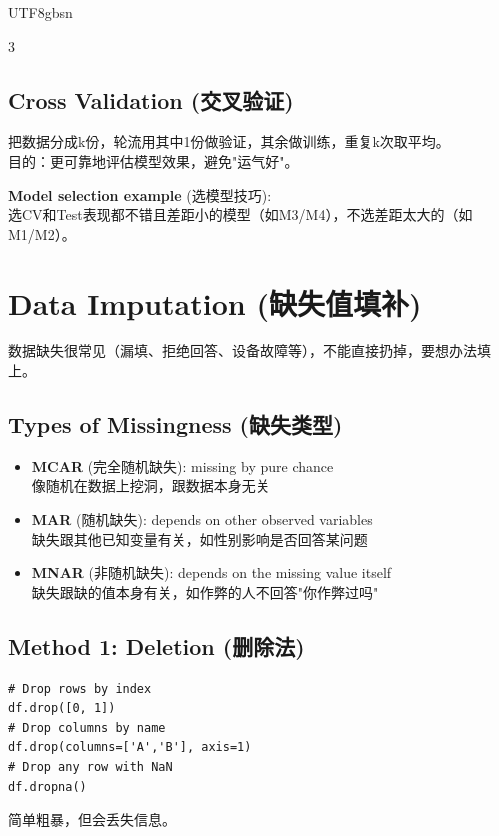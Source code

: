 \documentclass[10pt,landscape,a4paper]{article}
\newcommand{\zhint}[1]{{\scriptsize\color{gray!70!black}#1}}
\begin{document}
\begin{CJK}{UTF8}{gbsn}
\begin{multicols}{3}
\subsection{Cross Validation \zhint{(交叉验证)}}
\zhint{把数据分成k份，轮流用其中1份做验证，其余做训练，重复k次取平均。}\\
\zhint{目的：更可靠地评估模型效果，避免"运气好"。}

\textbf{Model selection example} \zhint{(选模型技巧)}:\\
\zhint{选CV和Test表现都不错且差距小的模型（如M3/M4），不选差距太大的（如M1/M2）。}

\section{Data Imputation \zhint{(缺失值填补)}}

\zhint{数据缺失很常见（漏填、拒绝回答、设备故障等），不能直接扔掉，要想办法填上。}

\subsection{Types of Missingness \zhint{(缺失类型)}}
\begin{itemize}[leftmargin=*, nosep, itemsep=1pt]
    \item \textbf{MCAR} \zhint{(完全随机缺失)}: missing by pure chance\\
    \zhint{像随机在数据上挖洞，跟数据本身无关}
    \item \textbf{MAR} \zhint{(随机缺失)}: depends on other observed variables\\
    \zhint{缺失跟其他已知变量有关，如性别影响是否回答某问题}
    \item \textbf{MNAR} \zhint{(非随机缺失)}: depends on the missing value itself\\
    \zhint{缺失跟缺的值本身有关，如作弊的人不回答"你作弊过吗"}
\end{itemize}

\subsection{Method 1: Deletion \zhint{(删除法)}}
\begin{lstlisting}
# Drop rows by index
df.drop([0, 1])
# Drop columns by name
df.drop(columns=['A','B'], axis=1)
# Drop any row with NaN
df.dropna()
\end{lstlisting}
\zhint{简单粗暴，但会丢失信息。}


\end{multicols}
\end{CJK}
\end{document}
